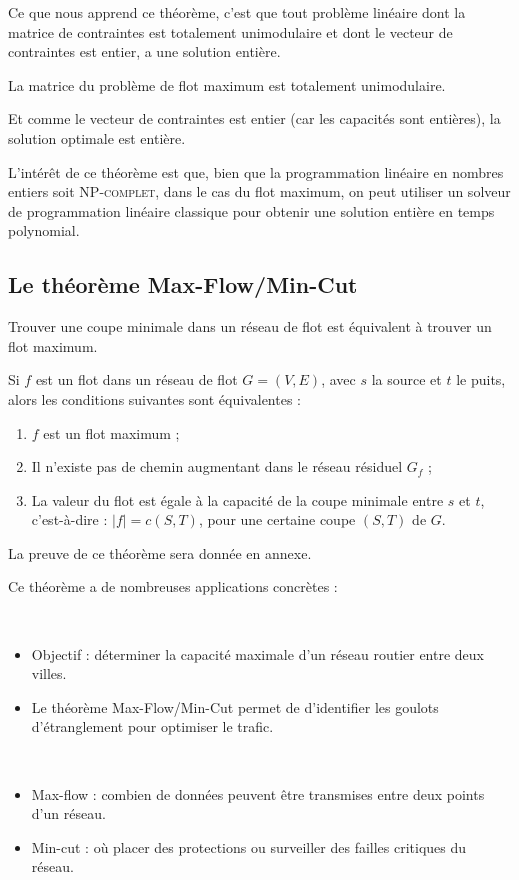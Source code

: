 \documentclass[a4paper]{article}
\begin{document}
Ce que nous apprend ce théorème, c'est que tout problème linéaire dont la matrice de contraintes est totalement unimodulaire et dont le vecteur de contraintes est entier, a une solution entière.
\begin{theorem}
La matrice du problème de flot maximum est totalement unimodulaire.
\end{theorem}
Et comme le vecteur de contraintes est entier (car les capacités sont entières), la solution optimale est entière.

L'intérêt de ce théorème est que, bien que la programmation linéaire en nombres entiers soit \textsc{NP-complet}, dans le cas du flot maximum, on peut utiliser un solveur de programmation linéaire classique pour obtenir une solution entière en temps polynomial.
\subsection{Le théorème Max-Flow/Min-Cut}
Trouver une coupe minimale dans un réseau de flot est équivalent à trouver un flot maximum.
\begin{theorem}
	Si $f$ est un flot dans un réseau de flot $G = (V, E)$, avec $s$ la source et $t$ le puits, alors les conditions suivantes sont équivalentes :
	\begin{enumerate}
		\item $f$ est un flot maximum ;
		\item Il n'existe pas de chemin augmentant dans le réseau résiduel $G_f$ ;
		\item La valeur du flot est égale à la capacité de la coupe minimale entre $s$ et $t$, c'est-à-dire : $|f| = c(S, T)$, pour une certaine coupe $(S, T)$ de $G$.
	\end{enumerate}
\end{theorem}
La preuve de ce théorème sera donnée en annexe.

Ce théorème a de nombreuses applications concrètes :
\begin{eg}\,

	\begin{itemize}[label={\color{gray}\small \textbullet}]
		\item Objectif : déterminer la capacité maximale d'un réseau routier entre deux villes.
		\item Le théorème Max-Flow/Min-Cut permet de d'identifier les goulots d'étranglement pour optimiser le trafic.
	\end{itemize}
\end{eg}
\begin{eg}\,

	\begin{itemize}[label={\color{gray}\small \textbullet}]
		\item Max-flow : combien de données peuvent être transmises entre deux points d'un réseau.
		\item Min-cut : où placer des protections ou surveiller des failles critiques du réseau.
	\end{itemize}
\end{eg}
\end{document}
